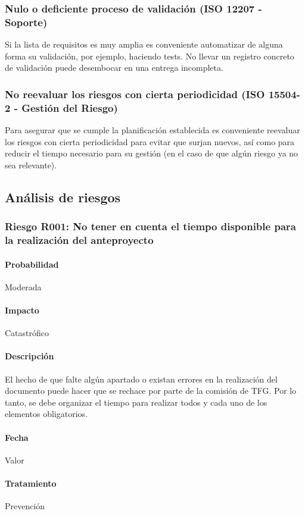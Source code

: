 \documentclass[10pt,a4paper]{article}
\begin{document}
			\subsubsection{Nulo o deficiente proceso de validación (ISO 12207 - Soporte)}
			Si la lista de requisitos es muy amplia es conveniente automatizar de alguna forma su validación, por ejemplo, haciendo tests. 
No llevar un registro concreto de validación puede desembocar en una entrega incompleta.
			\subsubsection{No reevaluar los riesgos con cierta periodicidad (ISO 15504-2 - Gestión del Riesgo)}
			Para asegurar que se cumple la planificación establecida es conveniente reevaluar los riesgos con cierta periodicidad para evitar que surjan nuevos, así como para reducir el tiempo necesario para su gestión (en el caso de que algún riesgo ya no sea relevante).
		\subsection{Análisis de riesgos}
			\subsubsection{Riesgo R001: No tener en cuenta el tiempo disponible para la realización del anteproyecto}
				\paragraph{Probabilidad} Moderada
				\paragraph{Impacto}	Catastrófico
				\paragraph{Descripción} El hecho de que falte algún apartado o existan errores en la realización del documento puede hacer que se rechace por parte de la comisión de TFG. Por lo tanto, se debe organizar el tiempo para realizar todos y cada uno de los elementos obligatorios.
				\paragraph{Fecha} Valor %
				\paragraph{Tratamiento} Prevención %
\end{document}

